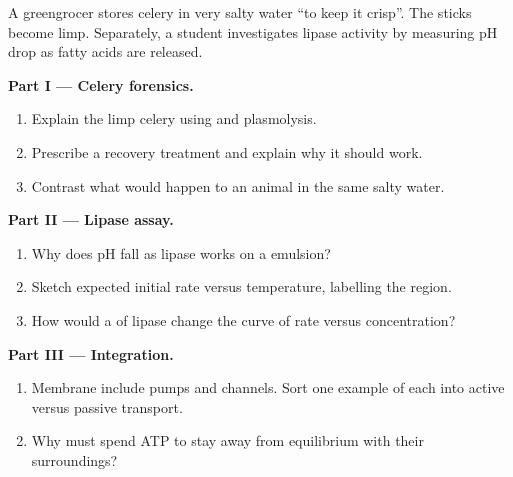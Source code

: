 \begin{problem}
\label{pb:g10:membranes-enzymes:1}
A greengrocer stores celery in very salty water ``to keep it crisp''.
The sticks become limp. Separately, a student investigates lipase
activity by measuring pH drop as fatty acids are released.

\medskip
\noindent\textbf{Part I --- Celery forensics.}
\begin{enumerate}
  \item Explain the limp celery using  and plasmolysis.
  \item Prescribe a recovery treatment and explain why it should work.
  \item Contrast what would happen to an animal  in the same salty
        water.
\end{enumerate}

\medskip
\noindent\textbf{Part II --- Lipase assay.}
\begin{enumerate}
  \item Why does pH fall as lipase works on a  emulsion?
  \item Sketch expected initial rate versus temperature, labelling the
         region.
  \item How would a  of lipase change the curve of
        rate versus  concentration?
\end{enumerate}

\medskip
\noindent\textbf{Part III --- Integration.}
\begin{enumerate}
  \item Membrane  include pumps and channels. Sort one example
        of each into active versus passive transport.
  \item Why must  spend ATP to stay away from equilibrium with
        their surroundings?
\end{enumerate}
\end{problem}
